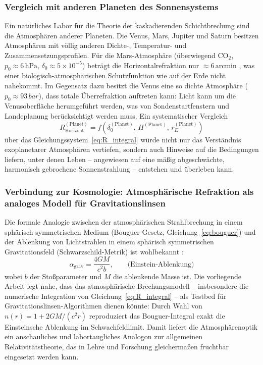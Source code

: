 \documentclass[12pt,a4paper]{article}
\providecommand{\SI}[2]{\ensuremath{#1\,#2}}
\providecommand{\ang}[1]{\ensuremath{#1\,\mathrm{arcmin}}}
\providecommand{\hecto}{\mathrm{h}}
\providecommand{\pascal}{\mathrm{Pa}}
\begin{document}
\subsubsection{Vergleich mit anderen Planeten des Sonnensystems}

Ein natürliches Labor für die Theorie der kaskadierenden Schichtbrechung
sind die Atmosphären anderer Planeten.
Die Venus, Mars, Jupiter und Saturn besitzen Atmosphären
mit völlig anderen Dichte-, Temperatur- und Zusammensetzungsprofilen.
Für die Mars-Atmosphäre (überwiegend CO$_2$, $p_0 \approx \SI{6}{\hecto\pascal}$,
$\delta_0 \approx 5\times10^{-5}$) beträgt die Horizontalrefraktion
nur $\approx \ang{6}$ \citep{Kliore1972},
was einer biologisch-atmosphärischen Schutzfunktion wie auf der Erde
nicht nahekommt.
Im Gegensatz dazu besitzt die Venus eine so dichte Atmosphäre
($p_0 \approx \SI{93}{bar}$), dass totale Überrefraktion auftreten kann:
Licht kann um die Venusoberfläche herumgeführt werden,
was von Sondenstartfenstern und Landeplanung berücksichtigt werden muss.
Ein systematischer Vergleich
\begin{equation}
  R_{\mathrm{Horizont}}^{(\mathrm{Planet})}
  = f\!\left(\delta_0^{(\mathrm{Planet})},\, H^{(\mathrm{Planet})},\,
             r_E^{(\mathrm{Planet})}\right)
  \label{eq:R_planeten}
\end{equation}
über das Gleichungssystem~\eqref{eq:R_integral} würde nicht nur das
Verständnis exoplanetarer Atmosphären vertiefen,
sondern auch Hinweise auf die Bedingungen liefern,
unter denen Leben -- angewiesen auf eine mäßig abgeschwächte,
harmonisch gebrochene Sonnenstrahlung -- entstehen und überleben kann.

\subsubsection{Verbindung zur Kosmologie: Atmosphärische Refraktion
               als analoges Modell für Gravitationslinsen}

Die formale Analogie zwischen der atmosphärischen Strahlbrechung
in einem sphärisch symmetrischen Medium (Bouguer-Gesetz,
Gleichung~\ref{eq:bouguer}) und der Ablenkung von Lichtstrahlen
in einem sphärisch symmetrischen Gravitationsfeld
(Schwarzschild-Metrik) ist wohlbekannt \citep{SchneiderEhlers1992}:
\begin{equation}
  \alpha_{\mathrm{grav}} = \frac{4GM}{c^2 b},
  \qquad \text{(Einstein-Ablenkung)}
  \label{eq:einstein}
\end{equation}
wobei $b$ der Stoßparameter und $M$ die ablenkende Masse ist.
Die vorliegende Arbeit legt nahe, dass das atmosphärische
Brechungsmodell -- insbesondere die numerische Integration
von Gleichung~\eqref{eq:R_integral} -- als Testbed für
Gravitationslinsen-Algorithmen dienen könnte:
Durch Wahl von $n(r) = 1 + 2GM/(c^2 r)$ reproduziert das
Bouguer-Integral exakt die Einsteinsche Ablenkung im Schwachfeldlimit.
Damit liefert die Atmosphärenoptik ein anschauliches und labortaugliches
Analogon zur allgemeinen Relativitätstheorie, das in
Lehre und Forschung gleichermaßen fruchtbar eingesetzt werden kann.
\end{document}
